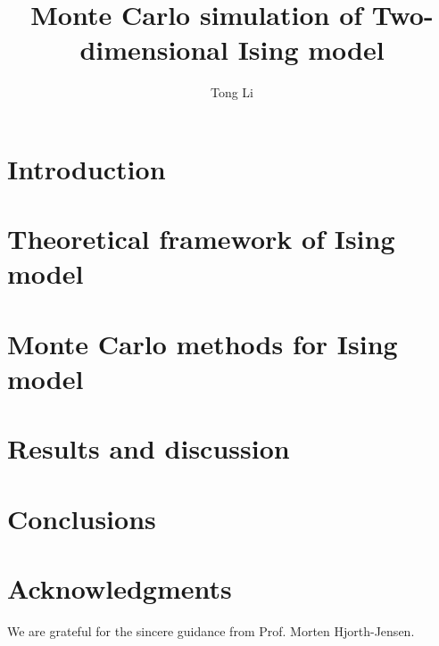 \documentclass{article}
\title{Monte Carlo simulation of Two-dimensional Ising model}
\author[1]{Tong Li}
\affil[1]{Department of Physics and Astronomy, Michigan State University}
\date{}
\begin{document}
\maketitle
\begin{abstract}\label{abstract}

\end{abstract}

\section{Introduction}\label{intro} 

	
\section{Theoretical framework of Ising model}\label{theory}

	
\section{Monte Carlo methods for Ising model}\label{method}

	
\section{Results and discussion}\label{results}

	
\section{Conclusions}\label{conclude}

	
\section*{Acknowledgments}
We are grateful for the sincere guidance from Prof. Morten Hjorth-Jensen. 
	
\nocite{*} 


\end{document}
